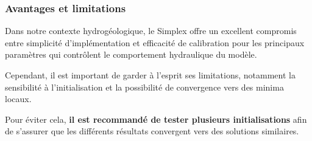 \subsubsection{Avantages et limitations}

Dans notre contexte hydrogéologique, le Simplex offre un excellent compromis entre simplicité d'implémentation et efficacité de calibration pour les principaux paramètres qui contrôlent le comportement hydraulique du modèle.

Cependant, il est important de garder à l'esprit ses limitations, notamment la sensibilité à l'initialisation et la possibilité de convergence vers des minima locaux. 

Pour éviter cela, \textbf{il est recommandé de tester plusieurs initialisations} afin de s'assurer que les différents résultats convergent vers des solutions similaires.